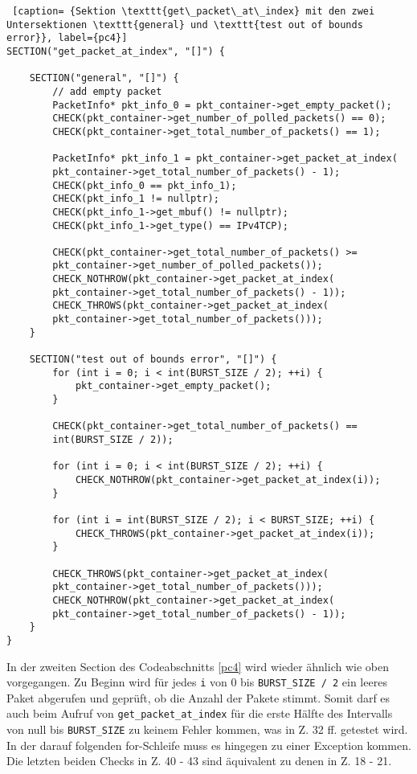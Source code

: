 \documentclass[../review_3.tex]{subfiles}
\begin{document}
\begin{lstlisting} [caption= {Sektion \texttt{get\_packet\_at\_index} mit den zwei Untersektionen \texttt{general} und \texttt{test out of bounds error}}, label={pc4}]
SECTION("get_packet_at_index", "[]") {
    
    SECTION("general", "[]") {
        // add empty packet
        PacketInfo* pkt_info_0 = pkt_container->get_empty_packet();
        CHECK(pkt_container->get_number_of_polled_packets() == 0);
        CHECK(pkt_container->get_total_number_of_packets() == 1);
        
        PacketInfo* pkt_info_1 = pkt_container->get_packet_at_index(
        pkt_container->get_total_number_of_packets() - 1);
        CHECK(pkt_info_0 == pkt_info_1);
        CHECK(pkt_info_1 != nullptr);
        CHECK(pkt_info_1->get_mbuf() != nullptr);
        CHECK(pkt_info_1->get_type() == IPv4TCP);
        
        CHECK(pkt_container->get_total_number_of_packets() >=
        pkt_container->get_number_of_polled_packets());
        CHECK_NOTHROW(pkt_container->get_packet_at_index(
        pkt_container->get_total_number_of_packets() - 1));
        CHECK_THROWS(pkt_container->get_packet_at_index(
        pkt_container->get_total_number_of_packets()));
    }
    
    SECTION("test out of bounds error", "[]") {
        for (int i = 0; i < int(BURST_SIZE / 2); ++i) {
            pkt_container->get_empty_packet();
        }
        
        CHECK(pkt_container->get_total_number_of_packets() ==
        int(BURST_SIZE / 2));
        
        for (int i = 0; i < int(BURST_SIZE / 2); ++i) {
            CHECK_NOTHROW(pkt_container->get_packet_at_index(i));
        }
        
        for (int i = int(BURST_SIZE / 2); i < BURST_SIZE; ++i) {
            CHECK_THROWS(pkt_container->get_packet_at_index(i));
        }
        
        CHECK_THROWS(pkt_container->get_packet_at_index(
        pkt_container->get_total_number_of_packets()));
        CHECK_NOTHROW(pkt_container->get_packet_at_index(
        pkt_container->get_total_number_of_packets() - 1));
    } 
}\end{lstlisting}

In der zweiten Section des Codeabschnitts \ref{pc4} wird wieder ähnlich wie oben vorgegangen. Zu Beginn wird für jedes \texttt{i} von 0 bis \texttt{BURST\_SIZE / 2} ein leeres Paket abgerufen und geprüft, ob die Anzahl der Pakete stimmt. Somit darf es auch beim Aufruf von \texttt{get\_packet\_at\_index} für die erste Hälfte des Intervalls von null bis \texttt{BURST\_SIZE} zu keinem Fehler kommen, was in Z. 32 ff. getestet wird. In der darauf folgenden for-Schleife muss es hingegen zu einer Exception kommen. Die letzten beiden Checks in Z. 40 - 43 sind äquivalent zu denen in Z. 18 - 21.
\end{document}
